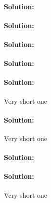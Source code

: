 \documentclass[12pt,a5paper]{article}
\newenvironment{sol}{\paragraph{Solution:}}{\filbreak\bigbreak}
\begin{document}
\begin{sol} \lipsum[3] \end{sol}
\begin{sol} \lipsum[3] \end{sol}
\begin{sol} \lipsum[3] \end{sol}
\begin{sol} \lipsum[3-10] \end{sol}
\begin{sol} Very short one \end{sol}
\begin{sol} Very short one \end{sol}
\begin{sol} \lipsum[3] \end{sol}
\begin{sol} Very short one \end{sol}
\end{document}
